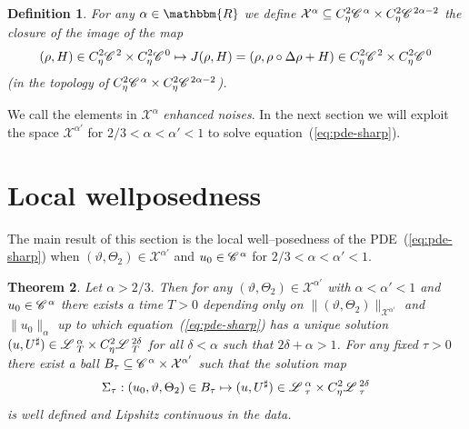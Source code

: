 \documentclass[11pt,reqno]{amsart}
\newcommand{\tmtextit}[1]{{\itshape{#1}}}
\newtheorem{theorem}{Theorem}
\newtheorem{definition}[theorem]{Definition}
\newcommand{\CC}{\mathscr{C} \hspace{.1em}}
\newcommand{\LL}{\mathscr{L} \hspace{.2em}}
\begin{document}
\begin{definition}
  For any $\alpha \in \mathbbm{R}$ we define $\mathcal{X}^{\alpha} \subseteq
  C^2_{\eta} \CC^{\alpha} \times C^2_{\eta} \CC^{2 \alpha - 2}$ the closure of
  the image of the map
  \[ (\rho, H) \in C^2_{\eta} \CC^2 \times C^2_{\eta} \CC^0 \mapsto J (\rho,
     H) = (\rho, \rho \circ \Delta \rho + H) \in C^2_{\eta} \CC^2 \times
     C^2_{\eta} \CC^0 \]
  (in the topology of $C^2_{\eta} \CC^{\alpha} \times C^2_{\eta} \CC^{2 \alpha
  - 2}$).
\end{definition}

We call the elements in $\mathcal{X}^{\alpha}$ \tmtextit{enhanced noises}. In
the next section we will exploit the space $\mathcal{X}^{\alpha'}$ for $2 / 3
< \alpha < \alpha' < 1$ to solve equation~(\ref{eq:pde-sharp}). \

\section{Local wellposedness\label{s:fixpoint}}

The main result of this section is the local well--posedness of the
PDE~(\ref{eq:pde-sharp}) when $(\vartheta, \Theta_2) \in
\mathcal{X}^{\alpha'}$ and $u_0 \in \CC^{\alpha}$ for $2 / 3 < \alpha <
\alpha' < 1$.

\begin{theorem}
  Let $\alpha > 2 / 3.$ Then for any $(\vartheta, \Theta_2) \in
  \mathcal{X}^{\alpha'}$ with $\alpha < \alpha' < 1$ and $u_0 \in
  \CC^{\alpha}$ there exists a time $T > 0$ depending only on $\| (\vartheta,
  \Theta_2) \|_{\mathcal{X}^{\alpha'}}$ and $\| u_0 \|_{\alpha}$ up to which
  equation~(\ref{eq:pde-sharp}) has a unique solution $(u, U^{\sharp}) \in
  \LL^{\alpha}_T \times C_{\eta}^2 \LL^{2 \delta}_T$ for all $\delta < \alpha$
  such that $2 \delta + \alpha > 1$. For any fixed $\tau > 0$ there exist a
  ball $B_{\tau} \subseteq \CC^{\alpha} \times \mathcal{X}^{\alpha'}$ such
  that the solution map
  \[ \Sigma_{\tau} : (u_0, \vartheta, \Theta_2) \in B_{\tau} \mapsto (u,
     U^{\sharp}) \in \LL^{\alpha}_{\tau} \times C_{\eta}^2 \LL^{2
     \delta}_{\tau} \]
  is well defined and Lipshitz continuous in the data. 
\end{theorem}
\end{document}

